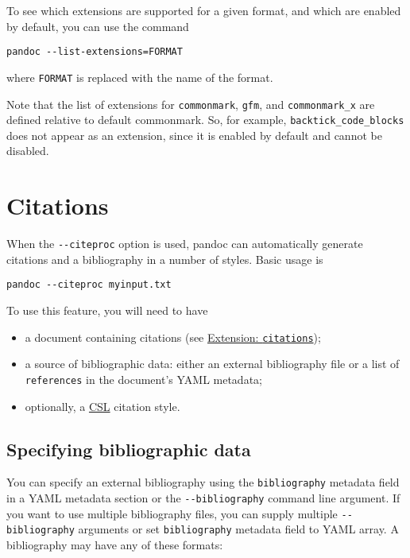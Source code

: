 \documentclass[
]{article}
\providecommand{\tightlist}{%
  \setlength{\itemsep}{0pt}\setlength{\parskip}{0pt}}
\begin{document}
To see which extensions are supported for a given format, and which are
enabled by default, you can use the command

\begin{verbatim}
pandoc --list-extensions=FORMAT
\end{verbatim}

where \texttt{FORMAT} is replaced with the name of the format.

Note that the list of extensions for \texttt{commonmark}, \texttt{gfm},
and \texttt{commonmark\_x} are defined relative to default commonmark.
So, for example, \texttt{backtick\_code\_blocks} does not appear as an
extension, since it is enabled by default and cannot be disabled.

\section{Citations}\label{citations}

When the \texttt{-\/-citeproc} option is used, pandoc can automatically
generate citations and a bibliography in a number of styles. Basic usage
is

\begin{verbatim}
pandoc --citeproc myinput.txt
\end{verbatim}

To use this feature, you will need to have

\begin{itemize}
\tightlist
\item
  a document containing citations (see
  \hyperref[org-citations]{Extension: \texttt{citations}});
\item
  a source of bibliographic data: either an external bibliography file
  or a list of \texttt{references} in the document's YAML metadata;
\item
  optionally, a
  \href{https://docs.citationstyles.org/en/stable/specification.html}{CSL}
  citation style.
\end{itemize}

\subsection{Specifying bibliographic
data}\label{specifying-bibliographic-data}

You can specify an external bibliography using the \texttt{bibliography}
metadata field in a YAML metadata section or the
\texttt{-\/-bibliography} command line argument. If you want to use
multiple bibliography files, you can supply multiple
\texttt{-\/-bibliography} arguments or set \texttt{bibliography}
metadata field to YAML array. A bibliography may have any of these
formats:
\end{document}
